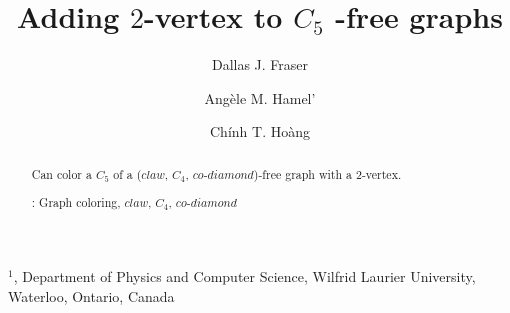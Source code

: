 \documentclass[12pt]{article}
\title{Adding $2$-vertex to $C_5$ {\CCD}-free graphs}
\author{
	Dallas J. Fraser\inst{1}
	\and Ang\`ele M. Hamel'\inst{1}
	\and Ch\'inh T. Ho\`ang\inst{1}
}
\def\inst#1{$^{#1}$}
\def\CCD{($claw$, $C_4$, $co$-$diamond$)}
\begin{document}
\maketitle

\begin{center}
{\footnotesize

\inst{1}, Department of Physics and Computer Science, Wilfrid Laurier
University, \\Waterloo, Ontario, Canada}

\end{center}

\begin{abstract}
Can color a $C_5$ of a {\CCD}-free graph with a $2$-vertex.

: Graph coloring, $claw$, $C_4$, $co$-$diamond$
\end{abstract}
\end{document}
